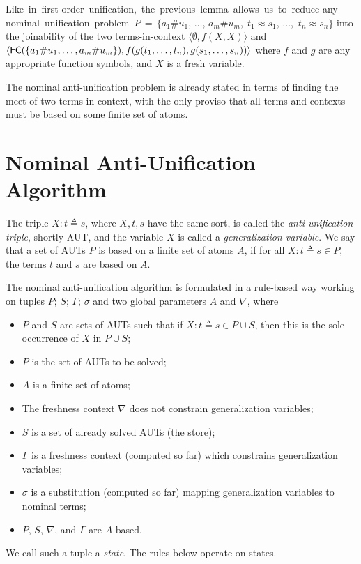 \documentclass{llncs}
\newcommand{\np}[2]{\langle #1, \allowbreak #2\rangle}
\newcommand{\Atoms}{A}
\newcommand{\nablai}{{\nabla}}
\newcommand{\nablag}{\Gamma}
\newcommand{\fe}{{\sf FC}}
\begin{document}
Like\, in\, first-order\, unification,\, the\, previous\, lemma\, allows\, us\, to\,
reduce any\, nominal\, unification\, problem\,
$P\,=\,\{a_1\#u_1,\,\dots,\,a_m\#u_m,\;t_1\approx s_1,\,\dots,$ $t_n\approx s_n\}$
into the joinability of the two terms-in-context
$\np{\emptyset}{f(X,X)}$ and
$\np{\fe(\allowbreak\{a_1\#u_1,\dots,\allowbreak a_m\#u_m\})}{f(g(t_1,\dots,t_n),g(s_1,\dots, \allowbreak s_n))}$
where $f$ and $g$ are any appropriate function symbols, and $X$ is a
fresh variable.

The nominal anti-unification problem is already stated in terms of
finding the meet of two terms-in-context, with the only proviso that
all terms and contexts must be based on some finite set of atoms.


\section{Nominal Anti-Unification Algorithm}
\label{sect:nau:alg}

The triple $X: t \triangleq s$, where $X,t,s$ have the same sort, is
called the \emph{anti-unification triple}, shortly AUT, and the
variable $X$ is called a \emph{generalization variable}. We say that
a set of AUTs $P$ is based on a finite set of atoms $A$, if for all ${
  X: t \triangleq s}\in P$, the terms $t$ and $s$ are based on $A$.



\begin{definition}
The nominal anti-unification algorithm is formulated in a rule-based
way working on tuples 
$P;\, S;\, \nablag;\,\sigma$ and two global parameters
  $\Atoms$ and $\nablai$, where
\begin{itemize}
 \item $P$ and $S$ are sets of AUTs such that if ${ X: t \triangleq s}
   \in P\cup S$, then this is the sole occurrence of $ X$ in $ P\cup
   S$;
 \item $P$ is the set of AUTs to be solved;
 \item $\Atoms$ is a finite set of atoms;
 \item The freshness context $ \nablai$ does not constrain generalization variables;
 \item $S$ is a set of already solved AUTs (the store);
 \item $\nablag$ is a freshness context (computed so far) which
   constrains generalization variables;
 \item $\sigma$ is a substitution (computed so far) mapping
   generalization variables to nominal terms;
 \item $P$, $S$, $\nablai$, and $\nablag$ are $\Atoms$-based.
\end{itemize}

We call such a tuple a \emph{state}. The rules below operate on
states.

\end{definition}
\end{document}
